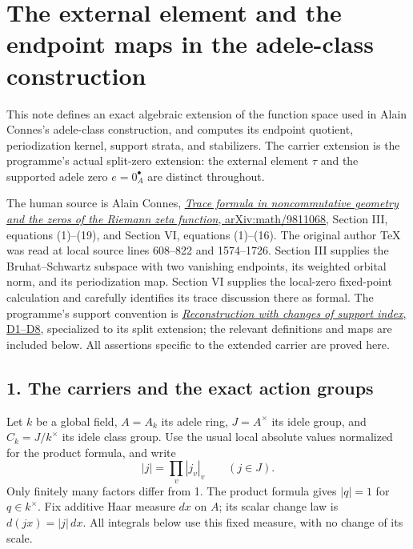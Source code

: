 \documentclass[
  10pt,
]{article}
\author{}
\date{}
\begin{document}
\section{The external element and the endpoint maps in the adele-class
construction}\label{the-external-element-and-the-endpoint-maps-in-the-adele-class-construction}

This note defines an exact algebraic extension of the function space
used in Alain Connes's adele-class construction, and computes its
endpoint quotient, periodization kernel, support strata, and
stabilizers. The carrier extension is the programme's actual split-zero
extension: the external element \(\tau\) and the supported adele zero
\(e=0_A^\bullet\) are distinct throughout.

The human source is Alain Connes,
\href{https://arxiv.org/abs/math/9811068}{\emph{Trace formula in
noncommutative geometry and the zeros of the Riemann zeta function},
arXiv:math/9811068}, Section III, equations (1)--(19), and Section VI,
equations (1)--(16). The original author TeX was read at local source
lines 608--822 and 1574--1726. Section III supplies the Bruhat--Schwartz
subspace with two vanishing endpoints, its weighted orbital norm, and
its periodization map. Section VI supplies the local-zero fixed-point
calculation and carefully identifies its trace discussion there as
formal. The programme's support convention is
\href{https://github.com/KokunoYumeto/zeta-function-research-reader/blob/39ced92952a9c807d51500783b221beb141da3b6/workbenches/splitzero-tandem/tex/support_diagrams.tex\#L9}{\emph{Reconstruction
with changes of support index}, D1--D8}, specialized to its split
extension; the relevant definitions and maps are included below. All
assertions specific to the extended carrier are proved here.

\subsection{1. The carriers and the exact action
groups}\label{the-carriers-and-the-exact-action-groups}

Let \(k\) be a global field, \(A=A_k\) its adele ring, \(J=A^\times\)
its idele group, and \(C_k=J/k^\times\) its idele class group. Use the
usual local absolute values normalized for the product formula, and
write \[
|j|=\prod_v|j_v|_v\qquad(j\in J).
\tag{TC1}
\] Only finitely many factors differ from 1. The product formula gives
\(|q|=1\) for \(q\in k^\times\). Fix additive Haar measure \(dx\) on
\(A\); its scalar change law is \(d(jx)=|j|\,dx\). All integrals below
use this fixed measure, with no change of its scale.
\end{document}
